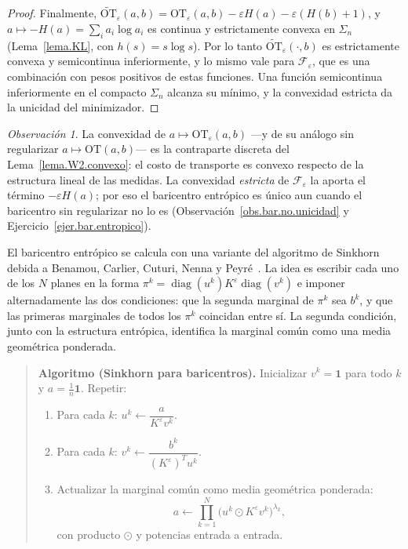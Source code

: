 \documentclass[12pt, a4paper]{amsbook}
\theoremstyle{remark}
\newtheorem{obs}[teo]{Observación}
\theoremstyle{definition}
\numberwithin{section}{chapter}
\numberwithin{subsection}{section}
\numberwithin{equation}{section}
\numberwithin{figure}{chapter}
\begin{document}
\begin{proof}
Finalmente, $\widetilde{\mathrm{OT}}_\varepsilon(a,b)=\mathrm{OT}_\varepsilon(a,b)-\varepsilon H(a)-\varepsilon(H(b)+1)$,
y $a\mapsto-H(a)=\sum_ia_i\log a_i$ es continua y estrictamente convexa en
$\Sigma_n$ (Lema~\ref{lema.KL}, con $h(s)=s\log s$). Por lo tanto
$\widetilde{\mathrm{OT}}_\varepsilon(\cdot,b)$ es estrictamente convexa y
semicontinua inferiormente, y lo mismo vale para $\mathcal F_\varepsilon$,
que es una combinación con pesos positivos de estas funciones. Una función
semicontinua inferiormente en el compacto $\Sigma_n$ alcanza su mínimo, y
la convexidad estricta da la unicidad del minimizador.
\end{proof}

\begin{obs}
La convexidad de $a\mapsto\mathrm{OT}_\varepsilon(a,b)$ —y de su análogo sin
regularizar $a\mapsto\mathrm{OT}(a,b)$— es la contraparte discreta del
Lema~\ref{lema.W2.convexo}: el costo de transporte es convexo respecto de la
estructura lineal de las medidas. La convexidad \emph{estricta} de
$\mathcal F_\varepsilon$ la aporta el término $-\varepsilon H(a)$; por eso el
baricentro entrópico es único aun cuando el baricentro sin regularizar no
lo es (Observación~\ref{obs.bar.no.unicidad} y
Ejercicio~\ref{ejer.bar.entropico}).
\end{obs}

El baricentro entrópico se calcula con una variante del algoritmo de Sinkhorn
debida a Benamou, Carlier, Cuturi, Nenna y Peyré~\cite{Benamou2015}. La idea
es escribir cada uno de los $N$ planes en la forma
$\pi^k=\operatorname{diag}(u^k)K^\varepsilon\operatorname{diag}(v^k)$ e
imponer alternadamente las dos condiciones: que la segunda marginal de
$\pi^k$ sea $b^k$, y que las primeras marginales de todos los $\pi^k$
coincidan entre sí. La segunda condición, junto con la estructura entrópica,
identifica la marginal común como una media geométrica ponderada.

\begin{quote}
\textbf{Algoritmo (Sinkhorn para baricentros).} Inicializar $v^k=\mathbf 1$
para todo $k$ y $a=\tfrac1n\mathbf 1$. Repetir:
\begin{enumerate}
\item Para cada $k$: $u^k\leftarrow\dfrac{a}{K^\varepsilon v^k}$.
\item Para cada $k$: $v^k\leftarrow\dfrac{b^k}{(K^\varepsilon)^Tu^k}$.
\item Actualizar la marginal común como media geométrica ponderada:
\[
a\leftarrow\prod_{k=1}^N\bigl(u^k\odot K^\varepsilon v^k\bigr)^{\lambda_k},
\]
con producto $\odot$ y potencias entrada a entrada.
\end{enumerate}
\end{quote}
\end{document}
